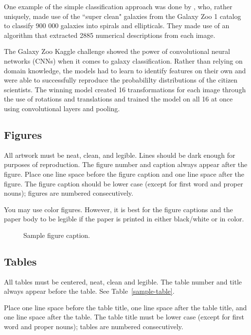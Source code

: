 \documentclass{article}
\begin{document}
One example of the simple classification approach was done by \cite{2016ApJS..223...20K}, who, rather uniquely, made use of the ``super clean" galaxies from the Galaxy Zoo 1 catalog \citep{2008MNRAS.389.1179L} to classify 900 000 galaxies into spirals and ellipticals. They made use of an algorithm that extracted 2885 numerical descriptions from each image.

The Galaxy Zoo Kaggle challenge showed the power of convolutional neural networks (CNNs) when it comes to galaxy classification. Rather than relying on domain knowledge, the models had to learn to identify features on their own and were able to successfully reproduce the probabililty distributions of the citizen scientists. The winning model created 16 transformations for each image through the use of rotations and translations and trained the model on all 16 at once using convolutional layers and pooling.




\subsection{Figures}

All artwork must be neat, clean, and legible. Lines should be dark
enough for purposes of reproduction. The figure number and caption
always appear after the figure. Place one line space before the figure
caption and one line space after the figure. The figure caption should
be lower case (except for first word and proper nouns); figures are
numbered consecutively.

You may use color figures.  However, it is best for the figure
captions and the paper body to be legible if the paper is printed in
either black/white or in color.
\begin{figure}[h]
  \centering
  \fbox{\rule[-.5cm]{0cm}{4cm} \rule[-.5cm]{4cm}{0cm}}
  \caption{Sample figure caption.}
\end{figure}

\subsection{Tables}

All tables must be centered, neat, clean and legible.  The table
number and title always appear before the table.  See
Table~\ref{sample-table}.

Place one line space before the table title, one line space after the
table title, and one line space after the table. The table title must
be lower case (except for first word and proper nouns); tables are
numbered consecutively.
\end{document}
